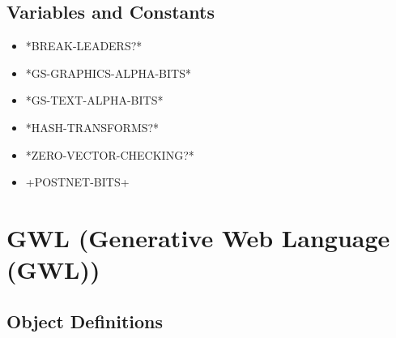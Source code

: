 \documentclass [11pt]{book}
\begin{document}
\subsection{Variables and Constants}

\label{subsec:variablesandconstants}



\begin{itemize}

\item {}*BREAK-LEADERS?*

\item {}*GS-GRAPHICS-ALPHA-BITS*

\item {}*GS-TEXT-ALPHA-BITS*

\item {}*HASH-TRANSFORMS?*

\item {}*ZERO-VECTOR-CHECKING?*

\item {}+POSTNET-BITS+

\end{itemize}





\section{GWL (Generative Web Language (GWL))}

\label{sec:gwl(generativeweblanguage(gwl))}





\subsection{Object Definitions}

\label{subsec:objectdefinitions}
\end{document}
